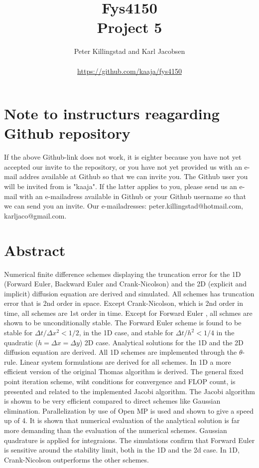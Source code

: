 \documentclass{article}
\title{Fys4150\\Project 5\\ }
\author{Peter Killingstad and Karl Jacobsen\\
\\
\url{https://github.com/kaaja/fys4150}}
\begin{document}
	
\maketitle

\section*{Note to instructurs reagarding Github repository}
If the above Github-link does not work, it is eighter because you have not yet accepted our invite to the repository, or you have not yet provided us with an e-mail addres available at Github so that we can invite you. The Github user you will be invited from is "kaaja". If the latter applies to you, please send us an e-mail with an e-mailadress available in Github or your Github username so that we can send you an invite. Our e-mailadresses: peter.killingstad@hotmail.com, karljaco@gmail.com.


\section*{Abstract}
Numerical finite difference schemes displaying the truncation error for the 1D (Forward Euler, Backward Euler and Crank-Nicolson) and the 2D (explicit and implicit) diffusion equation are derived and simulated. All schemes has truncation error that is 2nd order in space. Except Crank-Nicolson, which is 2nd order in time, all schemes are 1st order in time. Except for Forward Euler , all schmes are shown to be unconditionally stable. The Forward Euler scheme is found to be stable for $\Delta t/\Delta x^2 < 1/2$, in the 1D case, and stable for $\Delta t /h^2 < 1/4$ in the quadratic ($h = \Delta x = \Delta y$) 2D case. Analytical solutions for the 1D and the 2D diffusion equation are derived. All 1D schemes are implemented through the $\theta$-rule. Linear system formulations are derived for all schemes. In 1D a more efficient version of the original Thomas algorithm is derived. The general fixed point iteration scheme, wiht conditions for convergence and FLOP count, is presented and related to the implemented Jacobi algorithm. The Jacobi algorithm is showm to be very efficient compared to direct schemes like Gaussian elimination. Parallelization by use of Open MP is used and shown to give a speed up of 4. It is shown that numerical evaluation of the analytical solution is far more demanding than the evaluation of the numerical schemes. Gaussian quadrature is applied for integraions. The simulations confirm that Forward Euler is sensitive around the stability limit, both in the 1D and the 2d case. In 1D, Crank-Nicolson outperforms the other schemes.
\end{document}
